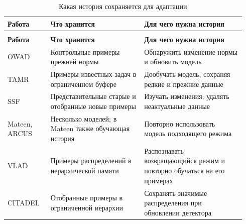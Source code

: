 \begingroup
\small
\setlength{\tabcolsep}{4pt}
\renewcommand{\arraystretch}{1.15}
\begin{longtable}{@{}>{\raggedright\arraybackslash}p{0.17\linewidth}
                        >{\raggedright\arraybackslash}p{0.37\linewidth}
                        >{\raggedright\arraybackslash}p{0.40\linewidth}@{}}
\caption{Какая история сохраняется для адаптации}
\label{tab:related_memory}\\
\toprule
\textbf{Работа} & \textbf{Что хранится} & \textbf{Для чего нужна история}\\
\midrule
\endfirsthead
\multicolumn{3}{l}{Продолжение таблицы~\thetable}\\
\toprule
\textbf{Работа} & \textbf{Что хранится} & \textbf{Для чего нужна история}\\
\midrule
\endhead
\bottomrule
\endfoot
OWAD & Контрольные примеры прежней нормы & Обнаружить изменение нормы и обновить модель\\
TAMR & Примеры известных задач в ограниченном буфере & Дообучать модель, сохраняя редкие и прежние данные\\
SSF & Представительные старые и отобранные новые примеры & Изучать изменения; удалять неактуальные данные\\
Mateen, ARCUS & Несколько моделей; в Mateen также обучающая история & Повторно использовать модель подходящего режима\\
VLAD & Примеры распределений в иерархической памяти & Распознавать возвращающийся режим и повторно обучаться на его примерах\\
CITADEL & Отобранные примеры в ограниченной иерархии & Сохранять значимые распределения при обновлении детектора\\
\end{longtable}
\endgroup

